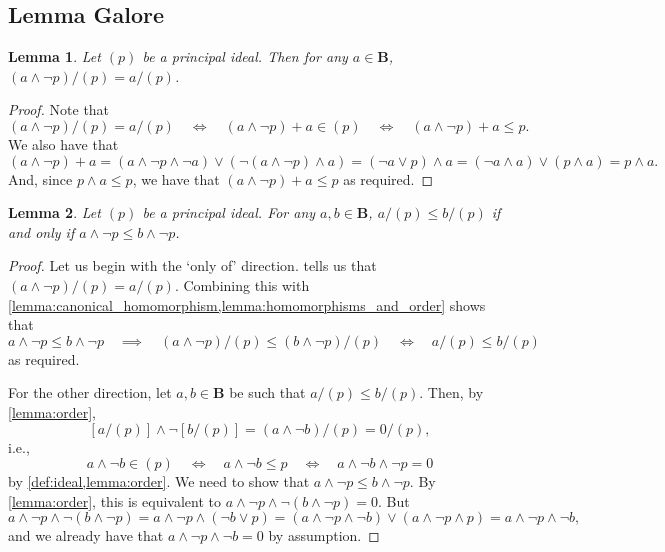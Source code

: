 \documentclass{article}
\newtheorem{lemma}{Lemma}
\theoremstyle{definition}
\theoremstyle{remark}
\begin{document}
\subsection{Lemma Galore}


\begin{lemma} \label{lemma:elements_in_quotients}
  Let $(p)$ be a principal ideal. Then for any $a \in \mathbf{B}$, $(a \land
  \neg p)/(p) = a/(p)$.
\end{lemma}
\begin{proof}
  Note that
  \[
    (a \land \neg p)/(p) = a/(p) \quad \iff \quad (a \land \neg p) + a \in (p)
    \quad \iff \quad (a \land \neg p) + a \le p.
  \]
  We also have that
  \[
    (a \land \neg p) + a = (a \land \neg p \land \neg a) \lor (\neg(a \land \neg
    p) \land a) = (\neg a \lor p) \land a = (\neg a \land a) \lor (p \land a) =
    p \land a.
  \]
  And, since $p \land a \le p$, we have that $(a \land \neg p) + a \le p$ as
  required.
\end{proof} %

\begin{lemma} \label{lemma:min_element_and_order}
  Let $(p)$ be a principal ideal. For any $a, b \in \mathbf{B}$, $a/(p) \le
  b/(p)$ if and only if $a \land \neg p \le b \land \neg p$.
\end{lemma}
\begin{proof}
  Let us begin with the `only of' direction. 
  tells us that $(a \land \neg p)/(p) = a/(p)$. Combining this with
  \cref{lemma:canonical_homomorphism,lemma:homomorphisms_and_order} shows that
  \[
    a \land \neg p \le b \land \neg p \quad \implies \quad (a \land \neg p)/(p)
    \le (b \land \neg p)/(p) \quad \iff \quad a/(p) \le b/(p)
  \]
  as required.

  For the other direction, let $a, b \in \mathbf{B}$ be such that $a/(p) \le
  b/(p)$. Then, by \cref{lemma:order},
  \[
    [a/(p)] \land \neg [b/(p)] = (a \land \neg b)/(p) = 0/(p),
  \]
  i.e.,
  \[
    a \land \neg b \in (p) \quad \iff \quad a \land \neg b \le p \quad \iff
    \quad a \land \neg b \land \neg p = 0
  \]
  by \cref{def:ideal,lemma:order}. We need to show that $a \land \neg p \le b
  \land \neg p$. By \cref{lemma:order}, this is equivalent to $a \land \neg p
  \land \neg(b \land \neg p) = 0$. But
  \[
    a \land \neg p \land \neg(b \land \neg p) = a \land \neg p \land (\neg b
    \lor p) = (a \land \neg p \land \neg b) \lor (a \land \neg p \land p) = a
    \land \neg p \land \neg b,
  \]
  and we already have that $a \land \neg p \land \neg b = 0$ by assumption.
\end{proof}
\end{document}
